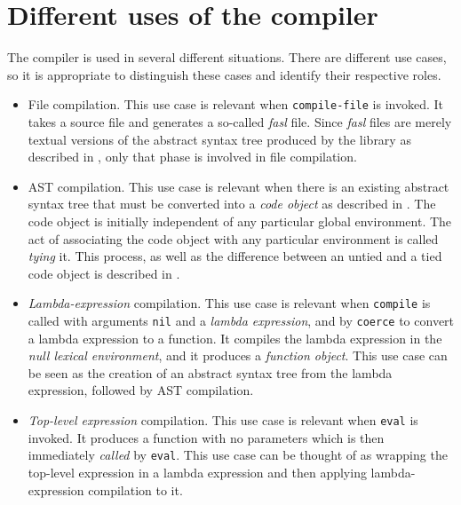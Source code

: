 \section{Different uses of the compiler}
\label{sec-different-uses-of-the-compiler}

The compiler is used in several different situations.  There are
different use cases, so it is appropriate to distinguish these cases
and identify their respective roles.

\begin{itemize}
\item File compilation.  This use case is relevant when
  \texttt{compile-file} is invoked.  It takes a \commonlisp{} source
  file and generates a so-called \emph{fasl} file.  Since \sysname{}
  \emph{fasl} files are merely textual versions of the abstract syntax
  tree produced by the \iconoclast{} library as described in
  , only that phase is involved in file
  compilation.

\item AST compilation.  This use case is relevant when there is an
  existing abstract syntax tree that must be converted into a
  \emph{code object} as described in
  .  The code object is
  initially independent of any particular global environment.  The act
  of associating the code object with any particular environment is
  called \emph{tying} it.  This process, as well as the difference
  between an untied and a tied code object is described in
  .

\item \emph{Lambda-expression} compilation.  This use case is relevant
  when \texttt{compile} is called with arguments \texttt{nil} and a
  \emph{lambda expression}, and by \texttt{coerce} to convert a lambda
  expression to a function.  It compiles the lambda expression in the
  \emph{null lexical environment}, and it produces a \emph{function
    object}.  This use case can be seen as the creation of an abstract
  syntax tree from the lambda expression, followed by AST compilation.

\item \emph{Top-level expression} compilation.  This use case is
  relevant when \texttt{eval} is invoked.  It produces a function with
  no parameters which is then immediately \emph{called} by
  \texttt{eval}.  This use case can be thought of as wrapping the
  top-level expression in a lambda expression and then applying
  lambda-expression compilation to it.

\end{itemize}

